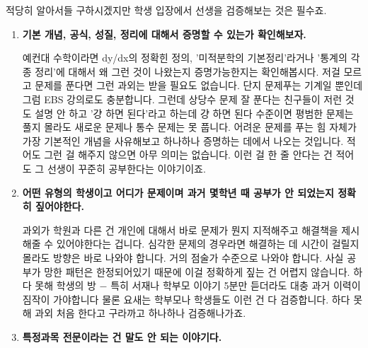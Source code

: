 \vspace{5mm}

적당히 알아서들 구하시겠지만 학생 입장에서 선생을 검증해보는 것은 필수죠.
\vspace{5mm}

\begin{enumerate}
    \item \textbf{기본 개념, 공식, 성질, 정리에 대해서 증명할 수 있는가 확인해보자.}
    \vspace{5mm}

    예컨대 수학이라면
    dy/dx의 정확힌 정의, '미적분학의 기본정리'라거나 '통계의 각종 정리'에 대해서 왜 그런 것이 나왔는지 증명가능한지는 확인해봅시다.
    저걸 모르고 문제를 푼다면 그런 과외는 받을 필요도 없습니다. 단지 문제푸는 기계일 뿐인데 그럼 EBS 강의로도 충분합니다.
    그런데 상당수 문제 잘 푼다는 친구들이 저런 것도 설명 안 하고 '걍 하면 된다'라고 하는데
    걍 하면 된다 수준이면 평범한 문제는 풀지 몰라도 새로운 문제나 통수 문제는 못 풉니다.
    어려운 문제를 푸는 힘 자체가 가장 기본적인 개념을 사유해보고 하나하나 증명하는 데에서 나오는 것입니다.
    적어도 그런 걸 해주지 않으면 아무 의미는 없습니다. 이런 걸 한 줄 안다는 건 적어도 그 선생이 꾸준히 공부한다는 이야기이죠.
    \vspace{5mm}

    \item \textbf{어떤 유형의 학생이고 어디가 문제이며 과거 몇학년 때 공부가 안 되었는지 정확히 짚어야한다.}
    \vspace{5mm}

    과외가 학원과 다른 건 개인에 대해서 바로 문제가 뭔지 지적해주고 해결책을 제시해줄 수 있어야한다는 겁니다.
    심각한 문제의 경우라면 해결하는 데 시간이 걸릴지 몰라도 방향은 바로 나와야 합니다. 거의 점술가 수준으로 나와야 합니다.
    사실 공부가 망한 패턴은 한정되어있기 때문에 이걸 정확하게 짚는 건 어렵지 않습니다.
    하다 못해 학생의 방 $-$ 특히 서재나 학부모 이야기 5분만 듣더라도 대충 과거 이력이 짐작이 가야합니다
    물론 요새는 학부모나 학생들도 이런 건 다 검증합니다. 하다 못해 과외 처음 한다고 구라까고 하나하나 검증해나가죠.
    \vspace{5mm}

    \item \textbf{특정과목 전문이라는 건 말도 안 되는 이야기다.}
    \vspace{5mm}


\end{enumerate}
